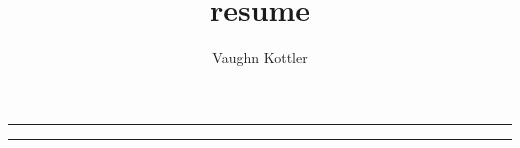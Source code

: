 \documentclass[letterpaper,10pt]{article}
\title{resume}
\author{Vaughn Kottler}
\begin{document}
\noindent
\noindent
\noindent

{\centering\noindent\rule{7.75in}{0.5pt}}\break

\noindent
\noindent
\noindent

{\centering\noindent\rule{7.75in}{0.5pt}}\break

\noindent
\noindent
\end{document}
